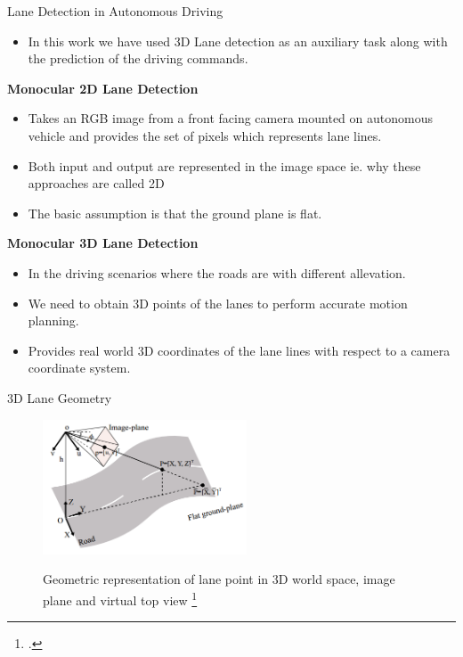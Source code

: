 \documentclass[aspectratio=169]{beamer}
\begin{document}
\begin{frame}{Lane Detection in Autonomous Driving}
    \begin{itemize}
        \item In this work we have used 3D Lane detection as an auxiliary task along with the prediction of the driving commands.
    \end{itemize}
    
    \textbf{Monocular 2D Lane Detection}
    \begin{itemize}
        \item Takes an RGB image from a front facing camera mounted on autonomous vehicle and provides the set of pixels which represents lane lines. 
        \item Both input and output are represented in the image space ie. why these approaches are called 2D
        \item The basic assumption is that the ground plane is flat.
        
    \end{itemize}
    
    \textbf{Monocular 3D Lane Detection}
    \begin{itemize}
        \item In the driving scenarios where the roads are with different allevation.
        \item We need to obtain 3D points of the lanes to perform accurate motion planning.
        \item Provides real world 3D coordinates of the lane lines with respect to a camera coordinate system.
    \end{itemize}
\end{frame}
\begin{frame}{3D Lane Geometry}
    \begin{figure}[H]
     \centering
     
\includegraphics[width=0.6\linewidth, height=4cm]{images/3d_lane_geometry.png} 
\label{fig:subim1}

\caption{Geometric representation of lane point in 3D world space, image plane and virtual top view \footcite{DBLP:journals/corr/abs-2112-15351} }
\label{fig:image2}
\end{figure}
\end{frame}
\end{document}
